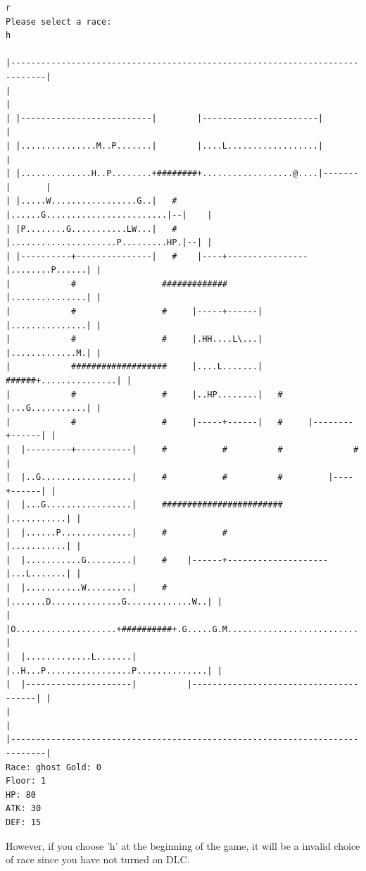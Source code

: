 \documentclass[11pt]{article}
\theoremstyle{plain}
\begin{document}
\begin{Verbatim}[fontsize=\scriptsize]
r
Please select a race:
h

|-----------------------------------------------------------------------------|
|                                                                             |
| |--------------------------|        |-----------------------|               |
| |...............M..P.......|        |....L..................|               |
| |..............H..P........+########+..................@....|-------|       |
| |.....W.................G..|   #    |......G........................|--|    |
| |P........G...........LW...|   #    |.....................P.........HP.|--| |
| |----------+---------------|   #    |----+----------------|........P......| |
|            #                 #############                |...............| |
|            #                 #     |-----+------|         |...............| |
|            #                 #     |.HH....L\...|         |.............M.| |
|            ###################     |....L.......|   ######+...............| |
|            #                 #     |..HP........|   #     |...G...........| |
|            #                 #     |-----+------|   #     |--------+------| |
|  |---------+-----------|     #           #          #              #        |
|  |..G..................|     #           #          #         |----+------| |
|  |...G.................|     ########################         |...........| |
|  |......P..............|     #           #                    |...........| |
|  |...........G.........|     #    |------+--------------------|...L.......| |
|  |...........W.........|     #    |.......D..............G.............W..| |
|  |O....................+##########+.G.....G.M.............................| |
|  |.............L.......|          |..H...P.................P..............| |
|  |---------------------|          |---------------------------------------| |
|                                                                             |
|-----------------------------------------------------------------------------|
Race: ghost Gold: 0                                                    Floor: 1
HP: 80
ATK: 30
DEF: 15
\end{Verbatim}

However, if you choose 'h' at the beginning of the game, it will be a invalid
choice of race since you have not turned on DLC.
\end{document}
